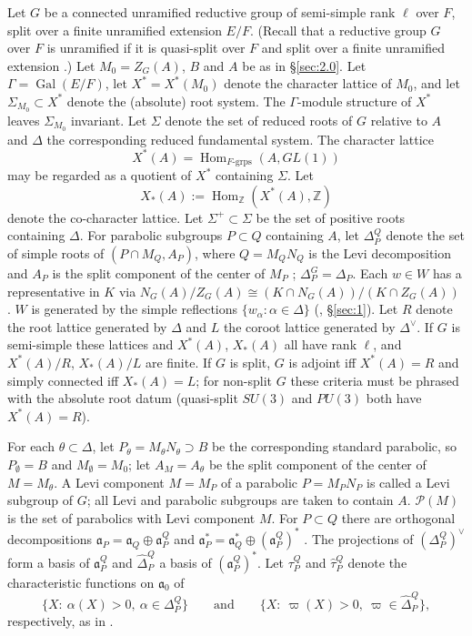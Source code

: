 \documentclass[12pt,letterpaper]{article}
\numberwithin{equation}{section}
\theoremstyle{plain}
\theoremstyle{remark}
\theoremstyle{plain}
\theoremstyle{definition}
\theoremstyle{remark}
\theoremstyle{remark}
\newcommand{\cP}{\mathcal{P}}
\newcommand{\fa}{\mathfrak{a}}
\DeclareMathOperator{\Hom}{Hom}
\DeclareMathOperator{\Gal}{Gal}
\begin{document}
Let $G$ be a connected unramified reductive group of semi-simple rank $\ell$ over $F$, split over a finite unramified extension $E/F$. (Recall that a reductive group $G$ over $F$ is unramified if it is quasi-split over $F$ and split over a finite unramified extension \cite[p.~135]{Ca79}.) Let $M_0=Z_G(A)$, $B$ and $A$ be as in \S\ref{sec:2.0}. Let $\Gamma=\Gal(E/F)$, let $X^*=X^*(M_0)$ denote the character lattice of $M_0$, and let $\Sigma_{M_0}\subset X^*$ denote the (absolute) root system. The $\Gamma$-module structure of $X^*$ leaves $\Sigma_{M_0}$ invariant. Let $\Sigma$ denote the set of reduced roots of $G$ relative to $A$ and $\Delta$ the corresponding reduced fundamental system. The character lattice
\begin{equation}\label{eq:2.1}
X^*(A)=\Hom_{F\text{-grps}}(A,GL(1))
\end{equation}
may be regarded as a quotient of $X^*$ containing $\Sigma$. Let
\begin{equation}\label{eq:2.2}
X_*(A):=\Hom_{\mathbb{Z}}(X^*(A),\mathbb{Z})
\end{equation}
denote the co-character lattice. Let $\Sigma^+\subset\Sigma$ be the set of positive roots containing $\Delta$. For parabolic subgroups $P\subset Q$ containing $A$, let $\Delta_P^Q$ denote the set of simple roots of $(P\cap M_Q,A_P)$, where $Q=M_QN_Q$ is the Levi decomposition and $A_P$ is the split component of the center of $M_P$ \cite{Ar81}; $\Delta_P^G=\Delta_P$. Each $w\in W$ has a representative in $K$ via $N_G(A)/Z_G(A)\cong(K\cap N_G(A))/(K\cap Z_G(A))$ \cite[p.~140]{Ca79}. $W$ is generated by the simple reflections $\{w_\alpha:\alpha\in\Delta\}$ (\cite{Ca95}, \S\ref{sec:1}). Let $R$ denote the root lattice generated by $\Delta$ and $L$ the coroot lattice generated by $\Delta^\vee$. If $G$ is semi-simple these lattices and $X^*(A)$, $X_*(A)$ all have rank $\ell$, and $X^*(A)/R$, $X_*(A)/L$ are finite. If $G$ is split, $G$ is adjoint iff $X^*(A)=R$ and simply connected iff $X_*(A)=L$; for non-split $G$ these criteria must be phrased with the absolute root datum (quasi-split $SU(3)$ and $PU(3)$ both have $X^*(A)=R$).

For each $\theta\subset\Delta$, let $P_\theta=M_\theta N_\theta\supset B$ be the corresponding standard parabolic, so $P_\emptyset=B$ and $M_\emptyset=M_0$; let $A_M=A_\theta$ be the split component of the center of $M=M_\theta$. A Levi component $M=M_P$ of a parabolic $P=M_PN_P$ is called a Levi subgroup of $G$; all Levi and parabolic subgroups are taken to contain $A$. $\cP(M)$ is the set of parabolics with Levi component $M$. For $P\subset Q$ there are orthogonal decompositions $\fa_P=\fa_Q\oplus\fa_P^Q$ and $\fa_P^*=\fa_Q^*\oplus(\fa_P^Q)^*$ \cite{Ar78}. The projections of $(\Delta_P^Q)^\vee$ form a basis of $\fa_P^Q$ and $\hat\Delta_P^Q$ a basis of $(\fa_P^Q)^*$. Let $\tau_P^Q$ and $\hat\tau_P^Q$ denote the characteristic functions on $\fa_0$ of
\[
\{X:\ \alpha(X)>0,\ \alpha\in\Delta_P^Q\}\qquad\text{and}\qquad\{X:\ \varpi(X)>0,\ \varpi\in\hat\Delta_P^Q\},
\]
respectively, as in \cite{Ar78}.
\end{document}
